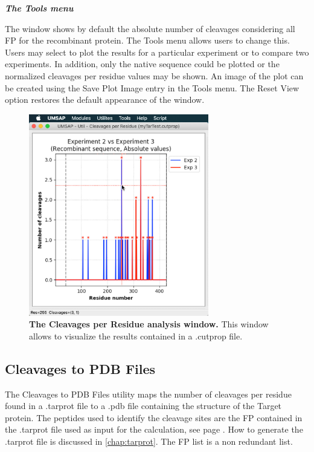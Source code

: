 \textit{\textbf{The Tools menu}}

The window shows by default the absolute number of cleavages considering all FP for the recombinant protein. The Tools menu allows users to change this. Users may select to plot the results for a particular experiment or to compare two experiments. In addition, only the native sequence could be plotted or the normalized cleavages per residue values may be shown. An image of the plot can be created using the Save Plot Image entry in the Tools menu. The Reset View option restores the default appearance of the window.   

\begin{figure}[h]
	\centering
	\includegraphics[width=0.7\textwidth]{./IMAGES/UTIL-CUTPROP-WINDOW/util-cutprop-res.jpg}	    
	\caption[The Cleavages per Residue analysis window]{\textbf{The Cleavages per Residue analysis window.} This window allows to visualize the results contained in a .cutprop file.} 
	\label{fig:utilCutsPerRes}
	\vspace{-5pt} 	
\end{figure}

\subsection{Cleavages to PDB Files}
\label{subsec:utilCut2Pdb}

The Cleavages to PDB Files utility maps the number of cleavages per residue found in a .tarprot file to a .pdb file containing the structure of the Target protein. The peptides used to identify the cleavage sites are the FP contained in the .tarprot file used as input for the calculation, see page \pageref{par:tarprotPIP}. How to generate the .tarprot file is discussed in \autoref{chap:tarprot}. The FP list is a non redundant list.

